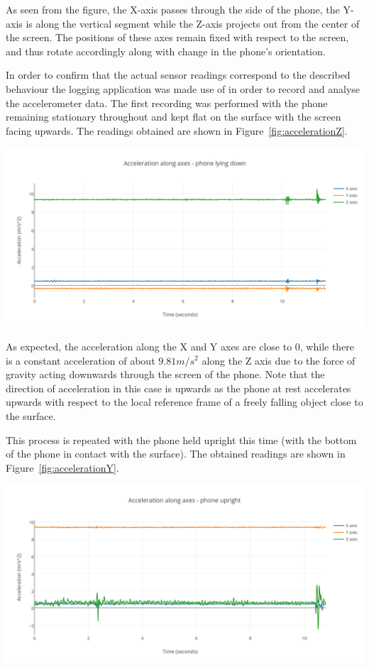 \documentclass[main.tex]{subfiles}
\begin{document}
As seen from the figure, the X-axis passes through the side of the phone, the Y-axis is along the vertical segment while the Z-axis projects out from the center of the screen. The positions of these axes remain fixed with respect to the screen, and thus rotate accordingly along with change in the phone's orientation. 


In order to confirm that the actual sensor readings correspond to the described behaviour the logging application was made use of in order to record and analyse the accelerometer data. The first recording was performed with the phone remaining stationary throughout and kept flat on the surface with the screen facing upwards. The readings obtained are shown in Figure~\ref{fig:accelerationZ}.

\begin{center}
\includegraphics[scale=0.9]{images/accelerationZ.png}
\label{fig:accelerationZ}
\end{center}

As expected, the acceleration along the X and Y axes are close to 0, while there is a constant acceleration of about $9.81 m/s^2$ along the Z axis due to the force of gravity acting downwards through the screen of the phone. Note that the direction of acceleration in this case is upwards as the phone at rest accelerates upwards with respect to the local reference frame of a freely falling object close to the surface. 

This process is repeated with the phone held upright this time (with the bottom of the phone in contact with the surface). The obtained readings are shown in Figure~\ref{fig:accelerationY}.

\begin{center}
\includegraphics[scale=0.9]{images/accelerationY.png}
\label{fig:accelerationY}
\end{center}
\end{document}
